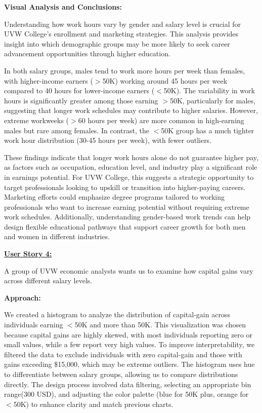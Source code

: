 \documentclass[journal,onecolumn]{IEEEtran}
\begin{document}
\textbf{Visual Analysis and Conclusions:} 


Understanding how work hours vary by gender and salary level is crucial for UVW College’s
enrollment and marketing strategies. This analysis provides insight into which demographic
groups may be more likely to seek career advancement opportunities through higher education.

In both salary groups, males tend to work more hours per week than females,
with higher-income earners ($>$50K) working around 45 hours per week compared to
40 hours for lower-income earners ($<$50K). The variability in work hours is
significantly greater among those earning $>$50K, particularly for males,
suggesting that longer work schedules may contribute to higher salaries.
However, extreme workweeks ($>$60 hours per week) are more common in
high-earning males but rare among females. In contrast, the $<$50K group
has a much tighter work hour distribution (30-45 hours per week), with fewer outliers.

These findings indicate that longer work hours alone do not guarantee higher
pay, as factors such as occupation, education level, and industry play a
significant role in earnings potential. For UVW College, this suggests a
strategic opportunity to target professionals looking to upskill or transition
into higher-paying careers. Marketing efforts could emphasize degree programs
tailored to working professionals who want to increase earning potential without
requiring extreme work schedules. Additionally, understanding gender-based work
trends can help design flexible educational pathways that support
career growth for both men and women in different industries.

\smallskip

\underline{\textbf{User Story 4:}}

A group of UVW economic analysts wants us to examine how capital gains vary across different salary levels.

\textbf{Approach:} 

We created a histogram to analyze the distribution of capital-gain across
individuals earning $<$50K and more than 50K. This visualization was chosen because
capital gains are highly skewed, with most individuals reporting zero or
small values, while a few report very high values. To improve interpretability,
we filtered the data to exclude individuals with zero capital-gain and
those with gains exceeding \$15,000, which may be extreme outliers.
The histogram uses hue to differentiate between salary groups, allowing us to compare distributions directly.
The design process involved data filtering, selecting an
appropriate bin range(300 USD), and adjusting the color palette (blue for 50K plus, orange for $<$50K)
to enhance clarity and match previous charts. 
\end{document}
